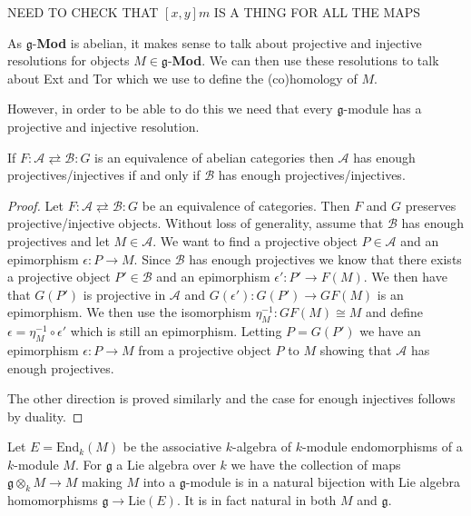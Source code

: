 NEED TO CHECK THAT $ [x,y]m $ IS A THING FOR ALL THE MAPS

As $ \mathfrak{g} $-\textbf{Mod} is abelian, it makes sense to talk about projective and injective resolutions for objects $ M \in \mathfrak{g} $-\textbf{Mod}. We can then use these resolutions to talk about Ext and Tor which we use to define the (co)homology of $ M $.

However, in order to be able to do this we need that every $ \mathfrak{g} $-module has a projective and injective resolution.
\begin{lemma}
  \label{lem:eqcat}
  If $ F:\mathcal{A} \rightleftarrows \mathcal{B}: G $ is an equivalence of abelian categories then $ \mathcal{A} $ has enough projectives/injectives if and only if $ \mathcal{B} $ has enough projectives/injectives.
\end{lemma}
\begin{proof}
  Let $ F:\mathcal{A} \rightleftarrows \mathcal{B}:G $ be an equivalence of categories. Then $ F $ and $ G $ preserves projective/injective objects. Without loss of generality, assume that $ \mathcal{B} $ has enough projectives and let $ M \in \mathcal{A} $. We want to find a projective object $ P \in \mathcal{A} $ and an epimorphism $ \epsilon: P \to M $. Since $ \mathcal{B} $ has enough projectives we know that there exists a projective object $ P' \in \mathcal{B} $ and an epimorphism $ \epsilon': P' \to F(M) $. We then have that $ G(P') $ is projective in $ \mathcal{A} $ and $ G(\epsilon'):G(P') \to GF(M) $ is an epimorphism. We then use the isomorphism $ \eta_M^{-1}:GF(M) \cong M $ and define $ \epsilon = \eta_M^{-1} \circ \epsilon' $ which is still an epimorphism. Letting $ P = G(P') $ we have an epimorphism $ \epsilon: P \to M $ from a projective object $ P $ to $ M $ showing that $ \mathcal{A} $ has enough projectives.

  The other direction is proved similarly and the case for enough injectives follows by duality.
\end{proof}
\begin{lemma}
  \label{lem:ex7.2.2}
  Let $ E = \text{End}_k(M) $ be the associative $ k $-algebra of $ k $-module endomorphisms of a $ k $-module $ M $. For $ \mathfrak{g} $ a Lie algebra over $ k $ we have the collection of maps $ \mathfrak{g} \otimes_k M \to M $ making $ M $ into a $ \mathfrak{g} $-module is in a natural bijection with Lie algebra homomorphisms $ \mathfrak{g} \to \text{Lie}(E) $. It is in fact natural in both $ M $ and $ \mathfrak{g} $.
\end{lemma}
